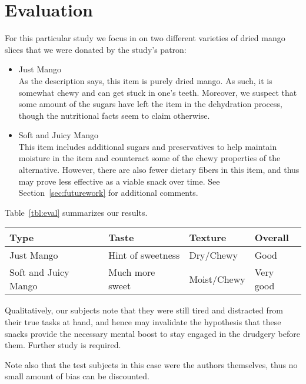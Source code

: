 \section{Evaluation}

For this particular study we focus in on two different varieties of dried mango slices that we were donated by the study's patron:

\begin{itemize}
    \item Just Mango \\
        As the description says, this item is purely dried mango.
        As such, it is somewhat chewy and can get stuck in one's teeth.
        Moreover, we suspect that some amount of the sugars have left the item in the dehydration process, though the nutritional facts seem to claim otherwise.
    \item Soft and Juicy Mango \\
        This item includes additional sugars and preservatives to help maintain moisture in the item and counteract some of the chewy properties of the alternative.
        However, there are also fewer dietary fibers in this item, and thus may prove less effective as a viable snack over time.
        See Section~\ref{sec:futurework} for additional comments.
\end{itemize}

Table~\ref{tbl:eval} summarizes our results.

\begin{table*}[t]
    \centering
    \begin{tabular}{|l|l|l|l|}
        \hline
        Type                    & Taste               & Texture     & Overall \\
        \hline
        Just Mango              & Hint of sweetness   & Dry/Chewy   & Good \\
        \hline
        Soft and Juicy Mango    & Much more sweet     & Moist/Chewy & Very good \\
        \hline
    \end{tabular}
    \caption{Evaluation Results}
    \label{tbl:eval}
\end{table*}

Qualitatively, our subjects note that they were still tired and distracted from their true tasks at hand, and hence may invalidate the hypothesis that these snacks provide the necessary mental boost to stay engaged in the drudgery before them.
Further study is required.

Note also that the test subjects in this case were the authors themselves, thus no small amount of bias can be discounted.
